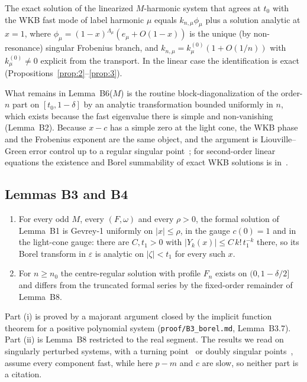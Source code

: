 \documentclass{amsart}
\numberwithin{equation}{section}
\theoremstyle{plain}
\newenvironment{lemnamed}[1]{\renewcommand\theinnerlem{#1}\innerlem}{\endinnerlem}
\theoremstyle{definition}
\theoremstyle{remark}
\newcommand{\eps}{\varepsilon}
\newcommand{\repo}[1]{\texttt{#1}}
\begin{document}
\begin{lemnamed}{B6($M$) (light-cone matching)}\label{lem:B6}
The exact solution of the linearized $M$-harmonic system that agrees at $t_0$ with the WKB fast mode of label harmonic $\mu$
equals $k_{n,\mu}\phi_\mu$ plus a solution analytic at $x = 1$, where $\phi_\mu = (1-x)^{\Lambda_\mu}(e_\mu + O(1-x))$ is the unique
(by non-resonance) singular Frobenius branch, and $k_{n,\mu} = k^{(0)}_\mu(1 + O(1/n))$ with $k^{(0)}_\mu \ne 0$ explicit from the
transport. In the linear case the identification is exact (Propositions~\ref{prop:2}--\ref{prop:3}).
\end{lemnamed}

What remains in Lemma~B6($M$) is the routine block-diagonalization of the order-$n$ part on $[t_0, 1 - \delta]$ by an
analytic transformation bounded uniformly in $n$, which exists because the fast eigenvalue there is simple and
non-vanishing (Lemma~B2). Because $x - c$ has a simple zero at the light cone, the WKB phase and the Frobenius exponent are
the same object, and the argument is Liouville--Green error control up to a regular singular point~\cite[Chs.~10--12]{Olver1974};
for second-order linear equations the existence and Borel summability of exact WKB solutions is in~\cite{Nikolaev2023}.

\subsection{Lemmas B3 and B4}

\begin{lemnamed}{B3($M$)}\label{lem:B3}
\begin{enumerate}[label=(\roman*),leftmargin=2em]
\item For every odd $M$, every $(F, \omega)$ and every $\rho > 0$, the formal solution of Lemma~B1 is Gevrey-1 uniformly on
$|x| \le \rho$, in the gauge $c(0) = 1$ and in the light-cone gauge: there are $C, t_1 > 0$ with $|Y_k(x)| \le C\,k!\,t_1^{-k}$
there, so its Borel transform in $\eps$ is analytic on $|\zeta| < t_1$ for every such $x$.
\item For $n \ge n_0$ the centre-regular solution with profile $F_n$ exists on $(0, 1 - \delta/2]$ and differs from the
truncated formal series by the fixed-order remainder of Lemma~B8.
\end{enumerate}
\end{lemnamed}

Part (i) is proved by a majorant argument closed by the implicit function theorem for a positive polynomial system
(\repo{proof/B3\_borel.md}, Lemma~B3.7). Part (ii) is Lemma~B8 restricted to the real segment. The results we read on
singularly perturbed systems, with a turning point~\cite{CanalisDurand1993} or doubly singular
points~\cite{CanalisDurandMozoSchaefke2007}, assume every component fast, while here $p - m$ and $c$ are slow, so neither
part is a citation.
\end{document}
